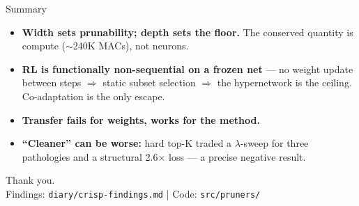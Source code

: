 \documentclass[10pt,aspectratio=169]{beamer}
\begin{document}
\begin{frame}{Summary}
  \begin{itemize}
    \item \textbf{Width sets prunability; depth sets the floor.} The conserved quantity is compute ($\sim$240K MACs), not neurons.
    \item \textbf{RL is functionally non-sequential on a frozen net} --- no weight update between steps $\Rightarrow$ static subset selection $\Rightarrow$ the hypernetwork is the ceiling. Co-adaptation is the only escape.
    \item \textbf{Transfer fails for weights, works for the method.}
    \item \textbf{``Cleaner'' can be worse:} hard top-K traded a $\lambda$-sweep for three pathologies and a structural 2.6$\times$ loss --- a precise negative result.
  \end{itemize}
\end{frame}

\begin{frame}[standout]
  Thank you.\\[0.6em]
  {\normalsize\normalfont Findings: \texttt{diary/crisp-findings.md} \;|\; Code: \texttt{src/pruners/}}
\end{frame}
\end{document}
